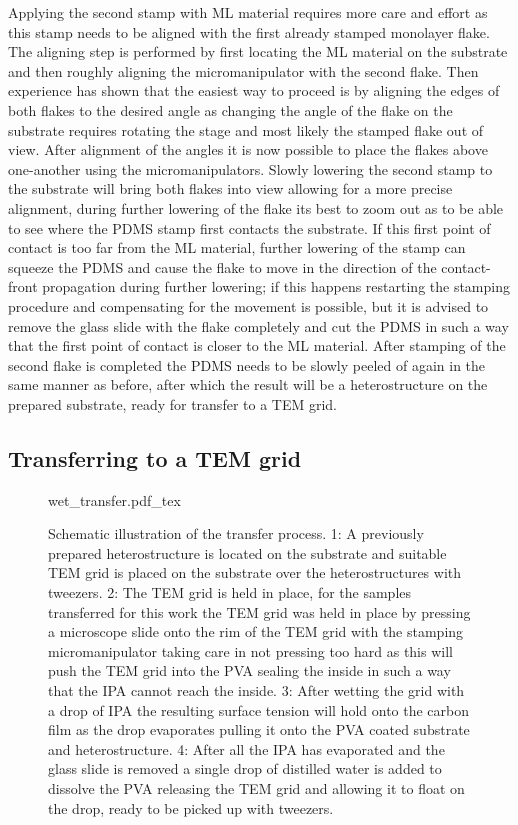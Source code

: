 Applying the second stamp with ML material requires more care and effort as this stamp needs to be aligned with the first already stamped monolayer flake. The aligning step is performed by first locating the ML material on the substrate and then roughly aligning the micromanipulator with the second flake. Then experience has shown that the easiest way to proceed is by aligning the edges of both flakes to the desired angle as changing the angle of the flake on the substrate requires rotating the stage and most likely the stamped flake out of view. After alignment of the angles it is now possible to place the flakes above one-another using the micromanipulators. Slowly lowering the second stamp to the substrate will bring both flakes into view allowing for a more precise alignment, during further lowering of the flake its best to zoom out as to be able to see where the PDMS stamp first contacts the substrate. If this first point of contact is too far from the ML material, further lowering of the stamp can squeeze the PDMS and cause the flake to move in the direction of the contact-front propagation during further lowering; if this happens restarting the stamping procedure and compensating for the movement is possible, but it is advised to remove the glass slide with the flake completely and cut the PDMS in such a way that the first point of contact is closer to the ML material.
After stamping of the second flake is completed the PDMS needs to be slowly peeled of again in the same manner as before, after which the result will be a heterostructure on the prepared substrate, ready for transfer to a TEM grid.

\subsection{Transferring to a TEM grid}
\begin{figure}[h]
	\centering
	\def\svgwidth{1\linewidth}
	{wet_transfer.pdf_tex}
	\caption{Schematic illustration of the transfer process. 1: A previously prepared heterostructure is located on the substrate and suitable TEM grid is placed on the substrate over the heterostructures with tweezers. 2: The TEM grid is held in place, for the samples transferred for this work the TEM grid was held in place by pressing a microscope slide onto the rim of the TEM grid with the stamping micromanipulator taking care in not pressing too hard as this will push the TEM grid into the PVA sealing the inside in such a way that the IPA cannot reach the inside. 3: After wetting the grid with a drop of IPA the resulting surface tension will hold onto the carbon film as the drop evaporates pulling it onto the PVA coated substrate and heterostructure. 4: After all the IPA has evaporated and the glass slide is removed a single drop of distilled water is added to dissolve the PVA releasing the TEM grid and allowing it to float on the drop, ready to be picked up with tweezers.}
	\label{fig:wet_transfer}
\end{figure}

